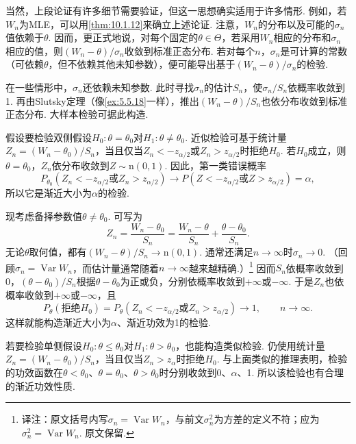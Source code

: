 当然，上段论证有许多细节需要验证，但这一思想确实适用于许多情形. 例如，若$W_n$为MLE，可以用\autoref{thm:10.1.12}来确立上述论证. 注意，$W_n$的分布以及可能的$\sigma_n$值依赖于$\theta$. 因而，更正式地说，对每个固定的$\theta\in\Theta$，若采用$W_n$相应的分布和$\sigma_n$相应的值，则$(W_n-\theta)/\sigma_n$收敛到标准正态分布.
若对每个$n$，$\sigma_n$是可计算的常数（可依赖$\theta$，但不依赖其他未知参数），便可能导出基于$(W_n-\theta)/\sigma_n$的检验.

在一些情形中，$\sigma_n$还依赖未知参数. 此时寻找$\sigma_n$的估计$S_n$，使$\sigma_n/S_n$依概率收敛到1. 再由Slutsky定理（像\autoref{ex:5.5.18}一样），推出$(W_n-\theta)/S_n$也依分布收敛到标准正态分布. 大样本检验可据此构造.

假设要检验双侧假设$H_0:\theta=\theta_0$对$H_1:\theta\ne\theta_0$. 近似检验可基于统计量$Z_n=(W_n-\theta_0)/S_n$，当且仅当$Z_n<-z_{\alpha/2}$或$Z_n>z_{\alpha/2}$时拒绝$H_0$. 若$H_0$成立，则$\theta=\theta_0$，$Z_n$依分布收敛到$Z\sim\mathrm n(0,1)$. 因此，第一类错误概率
$$P_{\theta_0}(Z_n<-z_{\alpha/2}\text{或}Z_n>z_{\alpha/2})\longrightarrow P(Z<-z_{\alpha/2}\text{或}Z>z_{\alpha/2})=\alpha,$$
所以它是渐近大小为$\alpha$的检验.

现考虑备择参数值$\theta\ne\theta_0$. 可写为
\begin{equation}\label{eq:10.3.3}
Z_n=\frac{W_n-\theta_0}{S_n}=\frac{W_n-\theta}{S_n}+\frac{\theta-\theta_0}{S_n}.
\end{equation}
无论$\theta$取何值，都有$(W_n-\theta)/S_n\to\mathrm n(0,1)$. 通常还满足$n\to\infty$时$\sigma_n\to0$. （回顾$\sigma_n=\operatorname{Var}W_n$，而估计量通常随着$n\to\infty$越来越精确.）\footnote{译注：原文括号内写$\sigma_n=\operatorname{Var}W_n$，与前文$\sigma_n^2$为方差的定义不符；应为$\sigma_n^2=\operatorname{Var}W_n$. 原文保留.} 因而$S_n$依概率收敛到0，$(\theta-\theta_0)/S_n$根据$\theta-\theta_0$为正或负，分别依概率收敛到$+\infty$或$-\infty$. 于是$Z_n$也依概率收敛到$+\infty$或$-\infty$，且
$$P_\theta(\text{拒绝$H_0$})=P_\theta(Z_n<-z_{\alpha/2}\text{或}Z_n>z_{\alpha/2})\longrightarrow1,\qquad n\to\infty.$$
这样就能构造渐近大小为$\alpha$、渐近功效为1的检验.

若要检验单侧假设$H_0:\theta\leq\theta_0$对$H_1:\theta>\theta_0$，也能构造类似检验. 仍使用统计量$Z_n=(W_n-\theta_0)/S_n$，当且仅当$Z_n>z_\alpha$时拒绝$H_0$. 与上面类似的推理表明，检验的功效函数在$\theta<\theta_0$、$\theta=\theta_0$、$\theta>\theta_0$时分别收敛到0、$\alpha$、1. 所以该检验也有合理的渐近功效性质.

